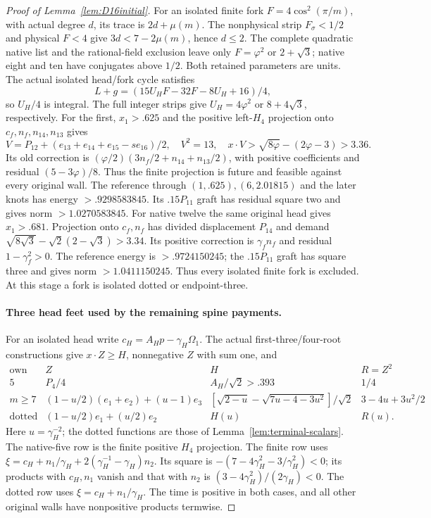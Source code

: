 \documentclass[11pt]{article}
\begin{document}
\begin{proof}[Proof of Lemma~\ref{lem:D16initial}]
For an isolated finite fork $F=4\cos^2(\pi/m)$, with actual degree
$d$, its trace is $2d+\mu(m)$. The nonphysical strip $F_\sigma<1/2$
and physical $F<4$ give $3d<7-2\mu(m)$, hence $d\le2$.
The complete quadratic native list and the rational-field exclusion
leave only $F=\varphi^2$ or $2+\sqrt3$; native eight and ten have
conjugates above $1/2$. Both retained parameters are units.
The actual isolated head/fork cycle satisfies
\[
 L+g=(15U_HF-32F-8U_H+16)/4,
\]
so $U_H/4$ is integral. The full integer strips give
$U_H=4\varphi^2$ or $8+4\sqrt3$, respectively.
For the first, $x_1>.625$ and the positive left-$H_4$ projection
onto $c_f,n_f,n_{14},n_{13}$ gives
\[
 V=P_{12}+(e_{13}+e_{14}+e_{15}-s e_{16})/2,\quad
 V^2=13,\quad x\cdot V>\sqrt{8\varphi}-(2\varphi-3)>3.36.
\]
Its old correction is
$(\varphi/2)(3n_f/2+n_{14}+n_{13}/2)$, with positive coefficients
and residual $(5-3\varphi)/8$. Thus the finite projection is future
and feasible against every original wall.
The reference through $(1,.625),(6,2.01815)$ and the later knots
has energy $>.9298583845$. Its $.15P_{11}$ graft has residual
square two and gives norm $>1.0270583845$.
For native twelve the same original head gives $x_1>.681$.
Projection onto $c_f,n_f$ has divided displacement $P_{14}$ and
demand
$\sqrt{8\sqrt3}-\sqrt2(2-\sqrt3)>3.34$.
Its positive correction is $\gamma_fn_f$ and residual
$1-\gamma_f^2>0$. The reference energy is $>.9724150245$;
the $.15P_{11}$ graft has square three and gives norm
$>1.0411150245$. Thus every isolated finite fork is excluded.
At this stage a fork is isolated dotted or endpoint-three.

\paragraph{Three head feet used by the remaining spine payments.}
For an isolated head write $c_H=A_Hp-\gamma_H\Omega_1$.
The actual first-three/four-root constructions give
$x\cdot Z\ge H$, nonnegative $Z$ with sum one, and
\[
\begin{array}{c|c|c|c}
\text{own}&Z&H&R=Z^2\\\hline
5&P_4/4&A_H/\sqrt2> .393&1/4\\
m\ge7&(1-u/2)(e_1+e_2)+(u-1)e_3&
{}[\sqrt{2-u}-\sqrt{7u-4-3u^2}]/\sqrt2&3-4u+3u^2/2\\
\text{dotted}&(1-u/2)e_1+(u/2)e_2&
H(u)&R(u).
\end{array}
\]
Here $u=\gamma_H^{-2}$; the dotted functions are those of
Lemma~\ref{lem:terminal-scalars}.
The native-five row is the finite positive $H_4$ projection.
The finite row uses
$\xi=c_H+n_1/\gamma_H+2(\gamma_H^{-1}-\gamma_H)n_2$.
Its square is $-(7-4\gamma_H^2-3/\gamma_H^2)<0$;
its products with $c_H,n_1$ vanish and that with $n_2$ is
$(3-4\gamma_H^2)/(2\gamma_H)<0$.
The dotted row uses $\xi=c_H+n_1/\gamma_H$.
The time is positive in both cases, and all other original walls
have nonpositive products termwise.


\end{proof}
\end{document}
